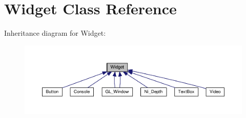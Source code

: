 \hypertarget{class_widget}{}\section{Widget Class Reference}
\label{class_widget}


Inheritance diagram for Widget\+:\nopagebreak
\begin{figure}[H]
\begin{center}
\leavevmode
\includegraphics[width=350pt]{class_widget__inherit__graph}
\end{center}
\end{figure}

